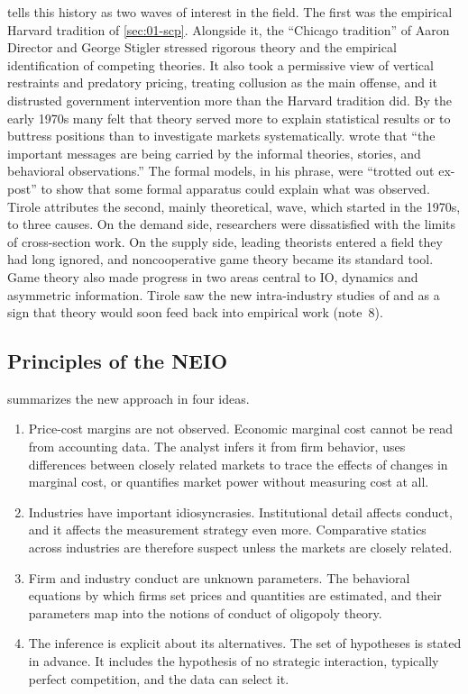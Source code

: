 \citet[Introduction]{Tirole1988} tells this history as two waves of interest in the field. The first was the
empirical Harvard tradition of \cref{sec:01-scp}. Alongside it, the ``Chicago tradition'' of Aaron Director and
George Stigler stressed rigorous theory and the empirical identification of competing theories. It also took a
permissive view of vertical restraints and predatory pricing, treating collusion as the main offense, and it
distrusted government intervention more than the Harvard tradition did. By the early 1970s many felt that theory
served more to explain statistical results or to buttress positions than to investigate markets systematically.
\citet[p.~273]{Joskow1975} wrote that ``the important messages are being carried by the informal theories,
stories, and behavioral observations.'' The formal models, in his phrase, were ``trotted out ex-post'' to show
that some formal apparatus could explain what was observed. Tirole attributes the second, mainly theoretical,
wave, which started in the 1970s, to three causes. On the demand side, researchers were dissatisfied with the
limits of cross-section work. On the supply side, leading theorists entered a field they had long ignored, and
noncooperative game theory became its standard tool. Game theory also made progress in two areas central to IO,
dynamics and asymmetric information. Tirole saw the new intra-industry studies of \citet{Porter1983} and
\citet{Bresnahan1987} as a sign that theory would soon feed back into empirical work (note~8).

\subsection{Principles of the NEIO}\label{sec:01-neio-principles}

\citet[p.~1012]{Bresnahan1989} summarizes the new approach in four ideas.
\begin{enumerate}
\item Price-cost margins are not observed. Economic marginal cost cannot be read from accounting data. The analyst
  infers it from firm behavior, uses differences between closely related markets to trace the effects of changes in
  marginal cost, or quantifies market power without measuring cost at all.
\item Industries have important idiosyncrasies. Institutional detail affects conduct, and it affects the measurement
  strategy even more. Comparative statics across industries are therefore suspect unless the markets are closely
  related.
\item Firm and industry conduct are unknown parameters. The behavioral equations by which firms set prices and
  quantities are estimated, and their parameters map into the notions of conduct of oligopoly theory.
\item The inference is explicit about its alternatives. The set of hypotheses is stated in advance. It includes the
  hypothesis of no strategic interaction, typically perfect competition, and the data can select it.
\end{enumerate}

